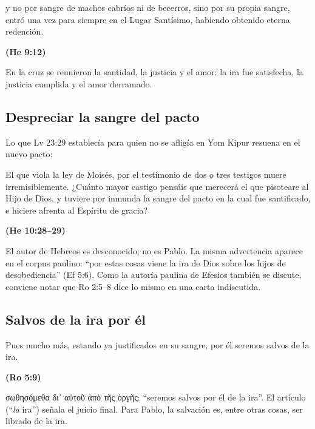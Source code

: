 \documentclass[11pt,letterpaper]{article}
\newcommand{\grc}[1]{\foreignlanguage{ancientgreek}{#1}}
\newcommand{\fuente}[1]{\par\hfill{\upshape\bfseries\small\textcolor{azul}{#1}}}
\begin{document}
\begin{cita}y no por sangre de machos cabríos ni de becerros, sino por su propia sangre, entró una vez para siempre en el Lugar Santísimo, habiendo obtenido eterna redención.\fuente{(He 9:12)}\end{cita}

\begin{tcolorbox}[colback=papiro,colframe=dorado,boxrule=1.2pt,arc=3pt]
\centering En la cruz se reunieron la santidad, la justicia y el amor: la ira fue satisfecha, la justicia cumplida y el amor derramado.
\end{tcolorbox}

\subsection{Despreciar la sangre del pacto}
Lo que Lv 23:29 establecía para quien no se afligía en Yom Kipur resuena en el nuevo pacto:

\begin{cita}El que viola la ley de Moisés, por el testimonio de dos o tres testigos muere irremisiblemente. ¿Cuánto mayor castigo pensáis que merecerá el que pisoteare al Hijo de Dios, y tuviere por inmunda la sangre del pacto en la cual fue santificado, e hiciere afrenta al Espíritu de gracia?\fuente{(He 10:28--29)}\end{cita}

\begin{nota}[Precisión]
El autor de Hebreos es desconocido; no es Pablo. La misma advertencia aparece en el corpus paulino: ``por estas cosas viene la ira de Dios sobre los hijos de desobediencia'' (Ef 5:6). Como la autoría paulina de Efesios también se discute, conviene notar que Ro 2:5--8 dice lo mismo en una carta indiscutida.
\end{nota}

\subsection{Salvos de la ira por él}
\begin{cita}Pues mucho más, estando ya justificados en su sangre, por él seremos salvos de la ira.\fuente{(Ro 5:9)}\end{cita}

\begin{filologia}[Ro 5:9]
\grc{σωθησόμεθα δι᾽ αὐτοῦ ἀπὸ τῆς ὀργῆς}: ``seremos salvos por él de la ira''. El artículo (``\emph{la} ira'') señala el juicio final. Para Pablo, la salvación es, entre otras cosas, ser librado de la ira.
\end{filologia}
\end{document}
